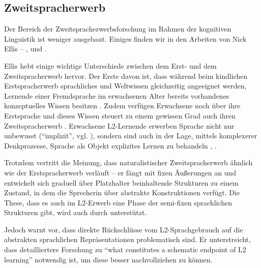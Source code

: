 \subsection{Zweitspracherwerb}
Der Bereich der Zweitspracherwerbsforschung im Rahmen der kognitiven Linguistik ist weniger ausgebaut.
Einiges finden wir in den Arbeiten von Nick Ellis -- \cite{Ellis04}, \cite{Ellis06} und \cite{Ellis08}.

Ellis hebt einige wichtige Unterschiede zwischen dem Erst- und dem Zweitspracherwerb hervor.
Der Erste davon ist, dass während beim kindlichen Erstspracherwerb sprachliches und Weltwissen gleichzeitig angeeignet werden, Lernende einer Fremdsprache im erwachsenen Alter bereits vorhandenes konzeptuelles Wissen besitzen \cite{Ellis08}.
Zudem verfügen Erwachsene noch über ihre Erstsprache und dieses Wissen steuert zu einem gewissen Grad auch ihren Zweitspracherwerb \cite{Ellis08}.
Erwachsene L2-Lernende erwerben Sprache nicht nur unbewusst (``implizit'', vgl. \cite{Ellis04}), sondern sind auch in der Lage, mittels komplexerer Denkprozesse, Sprache als Objekt explizites Lernen zu behandeln \cite{Ellis08}, \cite{Ellis04}.

Trotzdem vertritt \cite{Ellis08} die Meinung, dass naturalistischer Zweitspracherwerb ähnlich wie der Erstspracherwerb verläuft --
er fängt mit fixen Äußerungen an und entwickelt sich graduell über Platzhalter beinhaltende Strukturen zu einem Zustand, in dem die Sprecherin über abstrakte Konstruktionen verfügt.
Die These, dass es auch im L2-Erwerb eine Phase der semi-fixen sprachlichen Strukturen gibt, wird auch durch \cite{Eskildsen08} unterstützt.

Jedoch warnt \cite{Eskildsen08} vor, dass direkte Rückschlüsse vom L2-Sprachgebrauch auf die abstrakten sprachlichen Repräsentationen problematisch sind.
Er unterstreicht, dass detailliertere Forschung zu ``what constitutes a schematic endpoint of L2 learning'' notwendig ist, um diese besser nachvollziehen zu können.



